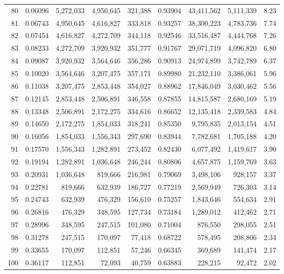 \begin{longtable}{rrrrrrrrr}
80 & 0.06096 & 5,272,033 & 4,950,645 & 321,388 & 0.93904 & 43,411,562 & 5,111,339 & 8.23 \\
81 & 0.06743 & 4,950,645 & 4,616,827 & 333,818 & 0.93257 & 38,300,223 & 4,783,736 & 7.74 \\
82 & 0.07454 & 4,616,827 & 4,272,709 & 344,118 & 0.92546 & 33,516,487 & 4,444,768 & 7.26 \\
83 & 0.08233 & 4,272,709 & 3,920,932 & 351,777 & 0.91767 & 29,071,719 & 4,096,820 & 6.80 \\
84 & 0.09087 & 3,920,932 & 3,564,646 & 356,286 & 0.90913 & 24,974,899 & 3,742,789 & 6.37 \\
85 & 0.10020 & 3,564,646 & 3,207,475 & 357,171 & 0.89980 & 21,232,110 & 3,386,061 & 5.96 \\
86 & 0.11038 & 3,207,475 & 2,853,448 & 354,027 & 0.88962 & 17,846,049 & 3,030,462 & 5.56 \\
87 & 0.12145 & 2,853,448 & 2,506,891 & 346,558 & 0.87855 & 14,815,587 & 2,680,169 & 5.19 \\
88 & 0.13348 & 2,506,891 & 2,172,275 & 334,616 & 0.86652 & 12,135,418 & 2,339,583 & 4.84 \\
89 & 0.14650 & 2,172,275 & 1,854,033 & 318,241 & 0.85350 & 9,795,835 & 2,013,154 & 4.51 \\
90 & 0.16056 & 1,854,033 & 1,556,343 & 297,690 & 0.83944 & 7,782,681 & 1,705,188 & 4.20 \\
91 & 0.17570 & 1,556,343 & 1,282,891 & 273,452 & 0.82430 & 6,077,492 & 1,419,617 & 3.90 \\
92 & 0.19194 & 1,282,891 & 1,036,648 & 246,244 & 0.80806 & 4,657,875 & 1,159,769 & 3.63 \\
93 & 0.20931 & 1,036,648 & 819,666 & 216,981 & 0.79069 & 3,498,106 & 928,157 & 3.37 \\
94 & 0.22781 & 819,666 & 632,939 & 186,727 & 0.77219 & 2,569,949 & 726,303 & 3.14 \\
95 & 0.24743 & 632,939 & 476,329 & 156,610 & 0.75257 & 1,843,646 & 554,634 & 2.91 \\
96 & 0.26816 & 476,329 & 348,595 & 127,734 & 0.73184 & 1,289,012 & 412,462 & 2.71 \\
97 & 0.28996 & 348,595 & 247,515 & 101,080 & 0.71004 & 876,550 & 298,055 & 2.51 \\
98 & 0.31278 & 247,515 & 170,097 & 77,418 & 0.68722 & 578,495 & 208,806 & 2.34 \\
99 & 0.33655 & 170,097 & 112,851 & 57,246 & 0.66345 & 369,689 & 141,474 & 2.17 \\
100 & 0.36117 & 112,851 & 72,093 & 40,759 & 0.63883 & 228,215 & 92,472 & 2.02 \\

\end{longtable}

